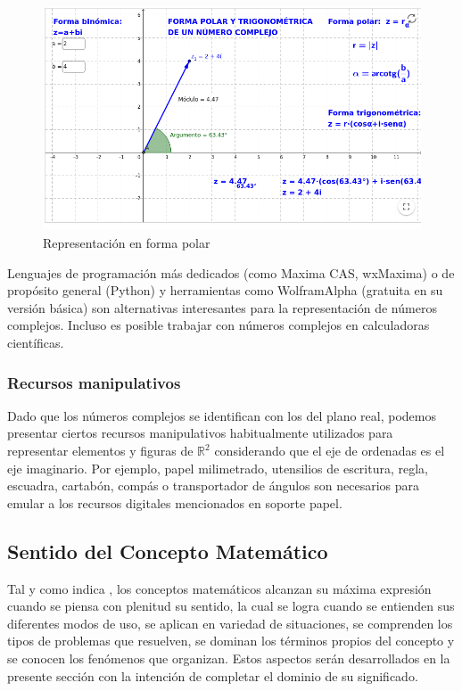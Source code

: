 \documentclass[../main.tex]{memoir}
\begin{document}
\begin{figure}[H]
	\centering
	\includegraphics[scale=0.3]{images/polar.png}
	\caption{Representación en forma polar}
	\label{geogebra3}
\end{figure}

Lenguajes de programación más dedicados (como Maxima CAS, wxMaxima) o de propósito general (Python) y herramientas como WolframAlpha (gratuita en su versión básica) son alternativas interesantes para la representación de números complejos. Incluso es posible trabajar con números complejos en calculadoras científicas.


\subsubsection{Recursos manipulativos}

Dado que los números complejos se identifican con los del plano real, podemos presentar ciertos recursos manipulativos habitualmente utilizados para representar elementos y figuras de $\mathbb{R}^2$ considerando que el eje de ordenadas es el eje imaginario. Por ejemplo, papel milimetrado, utensilios de escritura, regla, escuadra, cartabón, compás o transportador de ángulos son necesarios para emular a los recursos digitales mencionados en soporte papel.



\subsection{Sentido del Concepto Matemático}

Tal y como indica \cite{rico2016}, los conceptos matemáticos alcanzan su máxima expresión cuando se piensa con plenitud su sentido, la cual se logra cuando se entienden sus diferentes modos de uso, se aplican en variedad de situaciones, se comprenden los tipos de problemas que resuelven, se dominan los términos propios del concepto y se conocen los fenómenos que organizan. Estos aspectos serán desarrollados en la presente sección con la intención de completar el dominio de su significado. 
\end{document}
